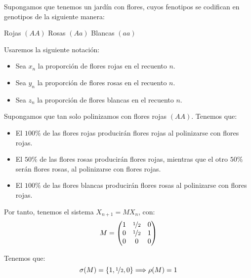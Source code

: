 \begin{ejemplo}
    Supongamos que tenemos un jardín con flores, cuyos fenotipos se codifican en genotipos de la siguiente manera:
    \begin{center}
        Rojas $(AA)$
        \hspace{1cm}
        Rosas $(Aa)$
        \hspace{1cm}
        Blancas $(aa)$
    \end{center}

    Usaremos la siguiente notación:
    \begin{itemize}
        \item Sea $x_n$ la proporción de flores rojas en el recuento $n$.
        \item Sea $y_n$ la proporción de flores rosas en el recuento $n$.
        \item Sea $z_n$ la proporción de flores blancas en el recuento $n$.
    \end{itemize}

    Supongamos que tan solo polinizamos con flores rojas $(AA)$. Tenemos que:
    \begin{itemize}
        \item El $100\%$ de las flores rojas producirán flores rojas al polinizarse con flores rojas.
        \item El $50\%$ de las flores rosas producirán flores rojas, mientras que el otro $50\%$ serán flores rosas, al polinizarse con flores rojas.
        \item El $100\%$ de las flores blancas producirán flores rosas al polinizarse con flores rojas.
    \end{itemize}

    Por tanto, tenemos el sistema $X_{n+1} = MX_n$, con:
    \begin{equation*}
        M = \begin{pmatrix}
            1 & \nicefrac{1}{2} & 0 \\
            0 & \nicefrac{1}{2} & 1 \\
            0 & 0 & 0 \\
        \end{pmatrix}
    \end{equation*}

    Tenemos que:
    \begin{equation*}
        \sigma(M) = \{1,\nicefrac{1}{2}, 0\} 
        \Longrightarrow
        \rho(M)=1
    \end{equation*}


\end{ejemplo}
